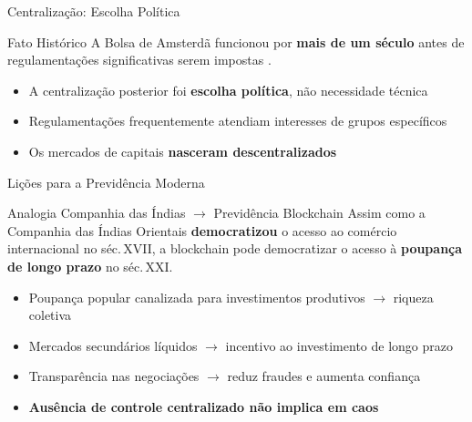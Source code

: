 \documentclass{libs/ufc_format}
\begin{document}
\begin{frame}{Centralização: Escolha Política}
    \begin{alertblock}{Fato Histórico}
        A Bolsa de Amsterdã funcionou por \textbf{mais de um século} antes de regulamentações significativas serem impostas \cite{dejong2005}.
    \end{alertblock}

    \vspace{0.3cm}

    \begin{itemize}
        \item A centralização posterior foi \textbf{escolha política}, não necessidade técnica
        \item Regulamentações frequentemente atendiam interesses de grupos específicos
        \item Os mercados de capitais \textbf{nasceram descentralizados}
    \end{itemize}

    \vspace{0.3cm}

\end{frame}

\begin{frame}{Lições para a Previdência Moderna}
    \begin{exampleblock}{Analogia Companhia das Índias $\to$ Previdência Blockchain}
        Assim como a Companhia das Índias Orientais \textbf{democratizou} o acesso ao comércio internacional no séc.\,XVII,
        a blockchain pode democratizar o acesso à \textbf{poupança de longo prazo} no séc.\,XXI.
    \end{exampleblock}

    \vspace{0.3cm}

    \begin{itemize}
        \item Poupança popular canalizada para investimentos produtivos $\to$ riqueza coletiva
        \item Mercados secundários líquidos $\to$ incentivo ao investimento de longo prazo
        \item Transparência nas negociações $\to$ reduz fraudes e aumenta confiança
        \item \textbf{Ausência de controle centralizado não implica em caos} \cite{petram2014}
    \end{itemize}
\end{frame}
\end{document}
